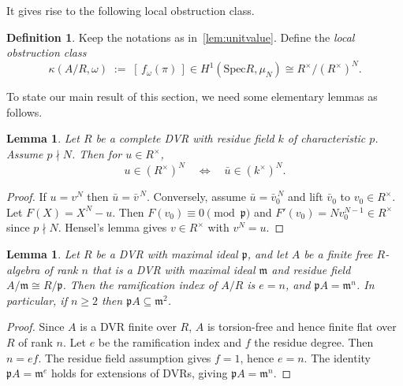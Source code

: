 \documentclass[11pt,letterpaper]{amsart}
\newcommand{\Spec}{\mathrm{Spec}}
\theoremstyle{plain}
\newtheorem{lemma}[theorem]{Lemma}
\theoremstyle{definition}
\newtheorem{definition}[theorem]{Definition}
\theoremstyle{remark}
\theoremstyle{plain}
\begin{document}
It gives rise to the following local obstruction class.

\begin{definition}\label{def:kappa}
Keep the notations as in~\ref{lem:unitvalue}. Define the \emph{local obstruction class}
\[
\kappa(A/R,\omega) \;:=\; [\,f_\omega(\pi)\,] \in H^1(\Spec R,\mu_N)\cong R^\times/(R^\times)^N.
\]
\end{definition}

To state our main result of this section, we need some elementary lemmas as follows.


\begin{lemma}\label{lem:henselN}
Let $R$ be a complete DVR with residue field $k$ of characteristic $p$.
Assume $p\nmid N$. Then for $u\in R^\times$,
\[
u\in (R^\times)^N \quad\Longleftrightarrow\quad \bar u \in (k^\times)^N.
\]
\end{lemma}

\begin{proof}
If $u=v^N$ then $\bar u=\bar v^{\,N}$.
Conversely, assume $\bar u=\bar v_0^{\,N}$ and lift $\bar v_0$ to $v_0\in R^\times$.
Let $F(X)=X^N-u$. Then $F(v_0)\equiv 0\pmod{\mathfrak p}$ and $F'(v_0)=Nv_0^{N-1}\in R^\times$
since $p\nmid N$. Hensel's lemma gives $v\in R^\times$ with $v^N=u$.
\end{proof}


\begin{lemma}\label{lem:e=n}
Let $R$ be a DVR with maximal ideal $\mathfrak p$, and let $A$ be a finite free $R$-algebra of rank $n$
that is a DVR with maximal ideal $\mathfrak m$ and residue field $A/\mathfrak m\cong R/\mathfrak p$.
Then the ramification index of $A/R$ is $e=n$, and $\mathfrak p A=\mathfrak m^n$.
In particular, if $n\ge 2$ then $\mathfrak pA\subseteq \mathfrak m^2$.
\end{lemma}

\begin{proof}
Since $A$ is a DVR finite over $R$, $A$ is torsion-free and hence finite flat over $R$ of rank $n$.
Let $e$ be the ramification index and $f$ the residue degree. Then $n=ef$.
The residue field assumption gives $f=1$, hence $e=n$.
The identity $\mathfrak pA=\mathfrak m^e$ holds for extensions of DVRs, giving $\mathfrak pA=\mathfrak m^n$.
\end{proof}
\end{document}

